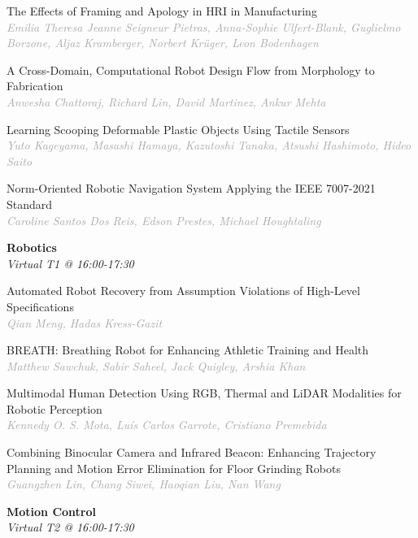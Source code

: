 \begin{multicols*}{2}
\small The Effects of Framing and Apology in HRI in Manufacturing\\ 
\footnotesize \textcolor{darkgray}{\textit{Emilia Theresa Jeanne Seigneur Pietras, Anna-Sophie  Ulfert-Blank, Guglielmo  Borzone, Aljaz  Kramberger, Norbert  Krüger, Leon  Bodenhagen}}

\small A Cross-Domain, Computational Robot Design Flow from Morphology to Fabrication\\ 
\footnotesize \textcolor{darkgray}{\textit{Anwesha Chattoraj, Richard  Lin, David  Martinez, Ankur  Mehta}}

\small Learning Scooping Deformable Plastic Objects Using Tactile Sensors\\ 
\footnotesize \textcolor{darkgray}{\textit{Yuto Kageyama, Masashi  Hamaya, Kazutoshi  Tanaka, Atsushi  Hashimoto, Hideo  Saito}}

\small Norm-Oriented Robotic Navigation System Applying the IEEE 7007-2021 Standard\\ 
\footnotesize \textcolor{darkgray}{\textit{Caroline Santos Dos Reis, Edson  Prestes, Michael  Houghtaling}}

\normalsize \textbf{Robotics}\\
\small \textit{Virtual T1 @ 16:00-17:30}

\small Automated Robot Recovery from Assumption Violations of High-Level Specifications\\ 
\footnotesize \textcolor{darkgray}{\textit{Qian Meng, Hadas  Kress-Gazit}}

\small BREATH: Breathing Robot for Enhancing Athletic Training and Health\\ 
\footnotesize \textcolor{darkgray}{\textit{Matthew Sawchuk, Sabir  Saheel, Jack  Quigley, Arshia  Khan}}

\small Multimodal Human Detection Using RGB, Thermal and LiDAR Modalities for Robotic Perception\\ 
\footnotesize \textcolor{darkgray}{\textit{Kennedy O. S. Mota, Luís Carlos  Garrote, Cristiano  Premebida}}

\small Combining Binocular Camera and Infrared Beacon: Enhancing Trajectory Planning and Motion Error Elimination for Floor Grinding Robots\\ 
\footnotesize \textcolor{darkgray}{\textit{Guangzhen Lin, Chang  Siwei, Haoqian  Liu, Nan  Wang}}

\normalsize \textbf{Motion Control}\\
\small \textit{Virtual T2 @ 16:00-17:30}


\end{multicols*}
